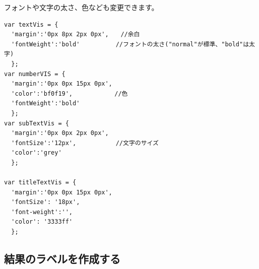 \documentclass[
]{book}
\begin{document}
フォントや文字の太さ、色なども変更できます。

\begin{verbatim}
var textVis = {
  'margin':'0px 8px 2px 0px',　　//余白
  'fontWeight':'bold'　　　　　　//フォントの太さ("normal"が標準、"bold"は太字)
  };
var numberVIS = {
  'margin':'0px 0px 15px 0px', 　
  'color':'bf0f19',　　　　　　　//色
  'fontWeight':'bold'
  };
var subTextVis = {
  'margin':'0px 0px 2px 0px',
  'fontSize':'12px',　　　　　　 //文字のサイズ
  'color':'grey'
  };

var titleTextVis = {
  'margin':'0px 0px 15px 0px',
  'fontSize': '18px', 
  'font-weight':'', 
  'color': '3333ff'
  };
\end{verbatim}

\hypertarget{ux7d50ux679cux306eux30e9ux30d9ux30ebux3092ux4f5cux6210ux3059ux308b}{%
\subsection{結果のラベルを作成する}\label{ux7d50ux679cux306eux30e9ux30d9ux30ebux3092ux4f5cux6210ux3059ux308b}}
\end{document}
